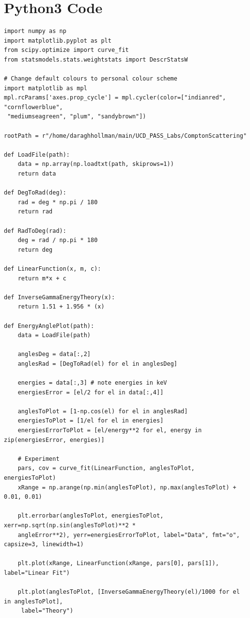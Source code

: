 \documentclass[%
reprint,
amsmath,amssymb,
aps,
floatfix
]{revtex4-2}
\begin{document}
	\section{Python3 Code}
\begin{lstlisting}
import numpy as np
import matplotlib.pyplot as plt
from scipy.optimize import curve_fit
from statsmodels.stats.weightstats import DescrStatsW

# Change default colours to personal colour scheme
import matplotlib as mpl
mpl.rcParams['axes.prop_cycle'] = mpl.cycler(color=["indianred", "cornflowerblue",
 "mediumseagreen", "plum", "sandybrown"]) 

rootPath = r"/home/daraghhollman/main/UCD_PASS_Labs/ComptonScattering"

def LoadFile(path):
    data = np.array(np.loadtxt(path, skiprows=1))
    return data

def DegToRad(deg):
    rad = deg * np.pi / 180
    return rad

def RadToDeg(rad):
    deg = rad / np.pi * 180
    return deg

def LinearFunction(x, m, c):
    return m*x + c
    
def InverseGammaEnergyTheory(x):
    return 1.51 + 1.956 * (x)
    
def EnergyAnglePlot(path):
    data = LoadFile(path)

    anglesDeg = data[:,2]
    anglesRad = [DegToRad(el) for el in anglesDeg]

    energies = data[:,3] # note energies in keV
    energiesError = [el/2 for el in data[:,4]]

    anglesToPlot = [1-np.cos(el) for el in anglesRad]
    energiesToPlot = [1/el for el in energies]
    energiesErrorToPlot = [el/energy**2 for el, energy in zip(energiesError, energies)]
    
    # Experiment
    pars, cov = curve_fit(LinearFunction, anglesToPlot, energiesToPlot)
    xRange = np.arange(np.min(anglesToPlot), np.max(anglesToPlot) + 0.01, 0.01)

    plt.errorbar(anglesToPlot, energiesToPlot, xerr=np.sqrt(np.sin(anglesToPlot)**2 * 
    angleError**2), yerr=energiesErrorToPlot, label="Data", fmt="o", capsize=3, linewidth=1)

    plt.plot(xRange, LinearFunction(xRange, pars[0], pars[1]), label="Linear Fit")

    plt.plot(anglesToPlot, [InverseGammaEnergyTheory(el)/1000 for el in anglesToPlot],
     label="Theory")


\end{lstlisting}
\end{document}

